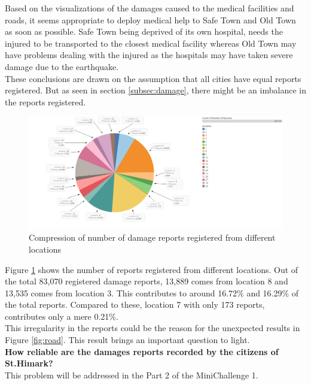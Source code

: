\documentclass[12pt]{extarticle}
\begin{document}
Based on the visualizations of the damages caused to the medical facilities and roads, it seems appropriate to deploy medical help to Safe Town and Old Town as soon as possible. Safe Town being deprived of its own hospital, needs the injured to be transported to the closest medical facility whereas Old Town may have problems dealing with the injured as the hospitals may have taken severe damage due to the earthquake. \\

These conclusions are drawn on the assumption that all cities have equal reports registered. But as seen in section \ref{subsec:damage}, there might be an imbalance in the reports registered. 

\begin{figure}[H]
\centering
	\includegraphics[width=\linewidth]{Images/RecordPercentile.png}
	\caption{Compression of number of damage reports registered from different locations}
	\label{fig:regrecords}
\end{figure}

Figure \ref{fig:regrecords} shows the number of reports registered from different locations. Out of the total 83,070 registered damage reports, 13,889 comes from location 8 and 13,535 comes from location 3. This contributes to around 16.72\% and 16.29\% of the total reports. Compared to these, location 7 with only 173 reports, contributes only a mere 0.21\%. \\

This irregularity in the reports could be the reason for the unexpected results in Figure \ref{fig:road}. This result brings an important question to light. \\

\noindent
\textbf{How reliable are the damages reports recorded by the citizens of St.Himark? } \\

\noindent
This problem will be addressed in the Part 2 of the MiniChallenge 1. 
\end{document}
